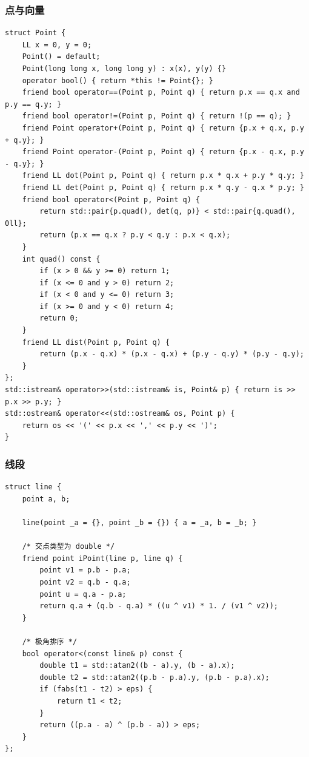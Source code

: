 \documentclass[UTF8, a4paper, titlepage, twoside]{ctexart}
\begin{document}
\subsubsection*{ 点与向量 }
\begin{lstlisting}[style=cpp]
struct Point {
    LL x = 0, y = 0;
    Point() = default;
    Point(long long x, long long y) : x(x), y(y) {}
    operator bool() { return *this != Point{}; }
    friend bool operator==(Point p, Point q) { return p.x == q.x and p.y == q.y; }
    friend bool operator!=(Point p, Point q) { return !(p == q); }
    friend Point operator+(Point p, Point q) { return {p.x + q.x, p.y + q.y}; }
    friend Point operator-(Point p, Point q) { return {p.x - q.x, p.y - q.y}; }
    friend LL dot(Point p, Point q) { return p.x * q.x + p.y * q.y; }
    friend LL det(Point p, Point q) { return p.x * q.y - q.x * p.y; }
    friend bool operator<(Point p, Point q) {
        return std::pair{p.quad(), det(q, p)} < std::pair{q.quad(), 0ll};
        return (p.x == q.x ? p.y < q.y : p.x < q.x);
    }
    int quad() const {
        if (x > 0 && y >= 0) return 1;
        if (x <= 0 and y > 0) return 2;
        if (x < 0 and y <= 0) return 3;
        if (x >= 0 and y < 0) return 4;
        return 0;
    }
    friend LL dist(Point p, Point q) {
        return (p.x - q.x) * (p.x - q.x) + (p.y - q.y) * (p.y - q.y);
    }
};
std::istream& operator>>(std::istream& is, Point& p) { return is >> p.x >> p.y; }
std::ostream& operator<<(std::ostream& os, Point p) {
    return os << '(' << p.x << ',' << p.y << ')';
}
\end{lstlisting}

\subsubsection*{ 线段 }

\begin{lstlisting}[style=cpp]
struct line {
    point a, b;

    line(point _a = {}, point _b = {}) { a = _a, b = _b; }

    /* 交点类型为 double */
    friend point iPoint(line p, line q) {
        point v1 = p.b - p.a;
        point v2 = q.b - q.a;
        point u = q.a - p.a;
        return q.a + (q.b - q.a) * ((u ^ v1) * 1. / (v1 ^ v2));
    }

    /* 极角排序 */
    bool operator<(const line& p) const {
        double t1 = std::atan2((b - a).y, (b - a).x);
        double t2 = std::atan2((p.b - p.a).y, (p.b - p.a).x);
        if (fabs(t1 - t2) > eps) {
            return t1 < t2;
        }
        return ((p.a - a) ^ (p.b - a)) > eps;
    }
};
\end{lstlisting}
\end{document}

